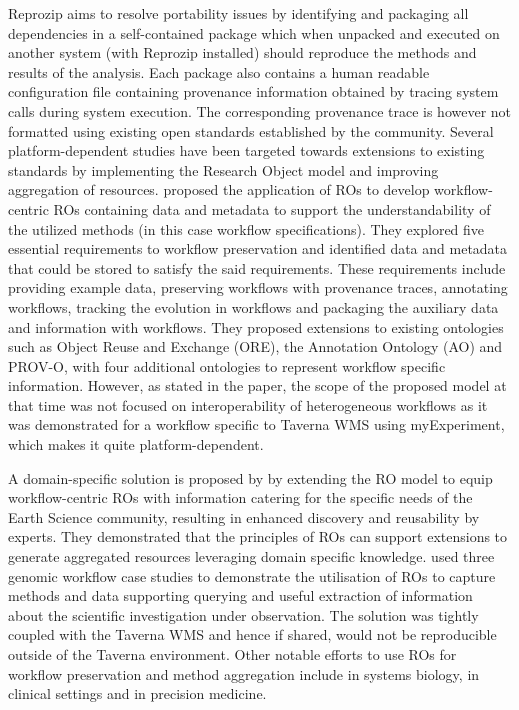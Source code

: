 \documentclass[a4paper,num-refs]{oup-contemporary}
\begin{document}
Reprozip\citep{Chirigati2016} aims to resolve portability issues by identifying and packaging all dependencies in a self-contained package which when unpacked and executed on another system (with Reprozip installed) should reproduce the methods and results of the analysis. Each package also contains a human readable configuration file containing provenance information obtained by tracing system calls during system execution. The corresponding provenance trace is however not formatted using existing open standards established by the community. 
Several platform-dependent studies have been targeted towards extensions to existing standards by implementing the Research Object model and improving aggregation of resources. \citet{belhajjame_2015} proposed the application of ROs to develop workflow-centric ROs containing data and metadata to support the understandability of the utilized methods (in this case workflow specifications). They explored five essential requirements to workflow preservation and identified data and metadata that could be stored to satisfy the said requirements. These requirements include providing example data, preserving workflows with provenance traces, annotating workflows, tracking the evolution in workflows and packaging the auxiliary data and information with workflows. They proposed extensions to existing ontologies such as Object Reuse and Exchange (ORE), the Annotation Ontology (AO) and PROV-O, with four additional ontologies to represent workflow specific information. However, as stated in the paper, the scope of the proposed model at that time was not focused on interoperability of heterogeneous workflows as it was demonstrated for a workflow specific to Taverna WMS using myExperiment, which makes it quite platform-dependent. 

A domain-specific solution is proposed by \citet{gomezperez_2017} by extending the RO model to equip workflow-centric ROs with information catering for the specific needs of the Earth Science community, resulting in enhanced discovery and reusability by experts. They demonstrated that the principles of ROs can support extensions to generate aggregated resources leveraging domain specific knowledge. \citet{hettne_2014} used three genomic workflow case studies to demonstrate the utilisation of ROs to capture methods and data supporting querying and useful extraction of information about the scientific investigation under observation. The solution was tightly coupled with the Taverna WMS and hence if shared, would not be reproducible outside of the Taverna environment. Other notable efforts to use ROs for workflow preservation and method aggregation include \citep{wolstencroft_2013} in systems biology, \citep{Custovic799} in clinical settings and \citep{Alterovitz2019} in precision medicine. 
\end{document}
